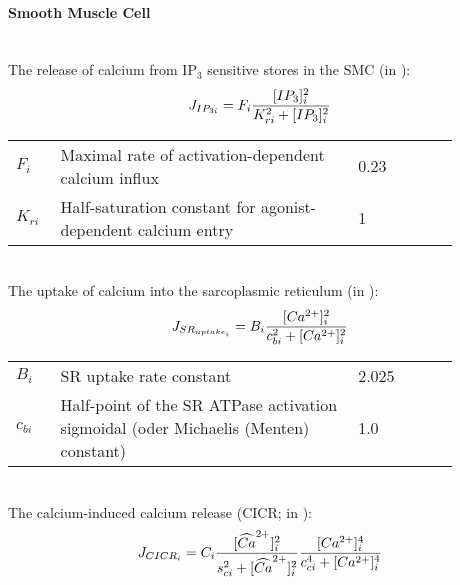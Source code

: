 \paragraph{Smooth Muscle Cell}~\\
%
The release of calcium from IP$_{3}$ sensitive stores in the SMC (in \uMps):
\begin{equation} \label{eq:IP3i}
J_{IP_{3i}} = F_{i}\frac{[IP_{3}]_{i}^{2}}{K_{ri}^{2}+[IP_{3}]_{i}^{2}}
\end{equation}
%
\begin{table}[h!]
\centering
\begin{tabular}{| p{0.09\linewidth} | >{\footnotesize} p{0.6\linewidth} | >{\footnotesize} p{0.17\linewidth} | >{\footnotesize} p{0.02\linewidth} |}
\arrayrulecolor{lightgrey}\hline
 $F_{i}$      			& Maximal rate of activation-dependent calcium influx			& 0.23 \uMps				& \cite{Koenigsberger2006} \\
$K_{ri}$				& Half-saturation constant for agonist-dependent calcium entry	& 1 \uM					& \cite{Koenigsberger2006} \\
\hline
\end{tabular}
\label{tab:IP3i}
\end{table}
\\
%
\newpage The uptake of calcium into the sarcoplasmic reticulum (in \uMs):
\begin{equation} \label{eq:JSRuptakei}
J_{SR_{uptake_{i}}} = B_{i}\frac{[Ca^{2+}]_{i}^{2}}{c_{bi}^{2}+[Ca^{2+}]_{i}^{2}}
\end{equation}
%
\begin{table}[h!]
\centering
\begin{tabular}{| p{0.09\linewidth} | >{\footnotesize} p{0.6\linewidth} | >{\footnotesize} p{0.17\linewidth} | >{\footnotesize} p{0.02\linewidth} |}
\arrayrulecolor{lightgrey}\hline
$B_{i}$      			& SR uptake rate constant							& 2.025 \uMs				& \cite{Koenigsberger2006} \\
$c_{bi}$				& Half-point of the SR ATPase activation sigmoidal (oder Michaelis (Menten) constant) 	& 1.0 \uM					& \cite{Koenigsberger2006} \\
\hline
\end{tabular}
\label{tab:JSRuptakei}
\end{table}
\\
%
The calcium-induced calcium release (CICR; in \uMs):
\begin{equation} \label{eq:JCICRi}
J_{CICR_{i}} = C_{i}\frac{[\widehat{Ca}^{2+}]_{i}^{2}}{s_{ci}^{2}+[\widehat{Ca}^{2+}]_{i}^{2}}    \frac{[Ca^{2+}]_{i}^{4}}{c_{ci}^{4}+[Ca^{2+}]_{i}^{4}}
\end{equation}
